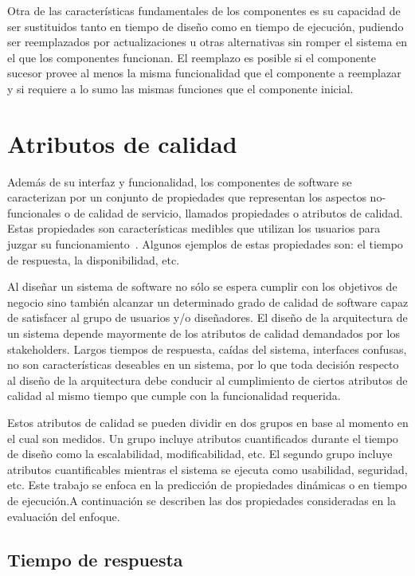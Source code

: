 Otra de las características fundamentales de los componentes es su
capacidad de ser sustituidos tanto en tiempo de diseño como en tiempo
de ejecución, pudiendo ser reemplazados por actualizaciones u otras
alternativas sin romper el sistema en el que los componentes funcionan.
El reemplazo es posible si el componente sucesor provee al menos la
misma funcionalidad que el componente a reemplazar y si requiere a
lo sumo las mismas funciones que el componente inicial. 


\section{Atributos de calidad \label{sec:Atributos-de-calidad}}

Además de su interfaz y funcionalidad, los componentes de software
se caracterizan por un conjunto de propiedades que representan los
aspectos no-funcionales o de calidad de servicio, llamados propiedades
o atributos de calidad. Estas propiedades son características medibles
que utilizan los usuarios para juzgar su funcionamiento~\cite{McGraw2012}.
Algunos ejemplos de estas propiedades son: el tiempo de respuesta,
la disponibilidad, etc. 

Al diseñar un sistema de software no sólo se espera cumplir con los
objetivos de negocio sino también alcanzar un determinado grado de
calidad de software capaz de satisfacer al grupo de usuarios y/o diseñadores.
El diseño de la arquitectura de un sistema depende mayormente de los
atributos de calidad demandados por los stakeholders. Largos tiempos
de respuesta, caídas del sistema, interfaces confusas, no son características
deseables en un sistema, por lo que toda decisión respecto al diseño
de la arquitectura debe conducir al cumplimiento de ciertos atributos
de calidad al mismo tiempo que cumple con la funcionalidad requerida.

Estos atributos de calidad se pueden dividir en dos grupos en base
al momento en el cual son medidos. Un grupo incluye atributos cuantificados
durante el tiempo de diseño como la escalabilidad, modificabilidad,
etc. El segundo grupo incluye atributos cuantificables mientras el
sistema se ejecuta como usabilidad, seguridad, etc. Este trabajo se
enfoca en la predicción de propiedades dinámicas o en tiempo de ejecución.A
continuación se describen las dos propiedades consideradas en la evaluación
del enfoque. 


\subsection*{Tiempo de respuesta\label{subsec:Atributos-de-calidad-Performance}}

